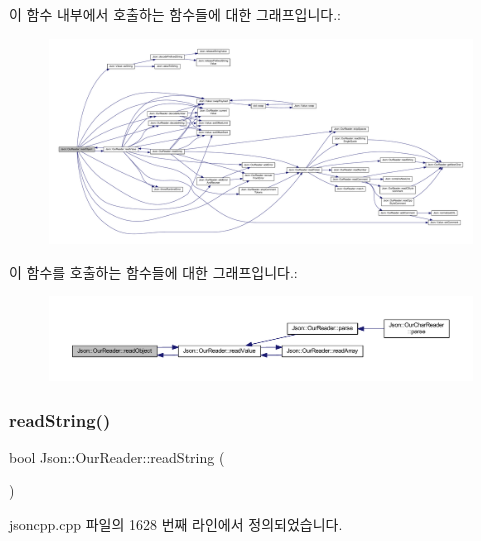 이 함수 내부에서 호출하는 함수들에 대한 그래프입니다.\+:\nopagebreak
\begin{figure}[H]
\begin{center}
\leavevmode
\includegraphics[width=350pt]{class_json_1_1_our_reader_aea198f8101dba55099f4d8121a993530_cgraph}
\end{center}
\end{figure}
이 함수를 호출하는 함수들에 대한 그래프입니다.\+:\nopagebreak
\begin{figure}[H]
\begin{center}
\leavevmode
\includegraphics[width=350pt]{class_json_1_1_our_reader_aea198f8101dba55099f4d8121a993530_icgraph}
\end{center}
\end{figure}
\mbox{\label{class_json_1_1_our_reader_a5d39b12671499ec5975f3bbc84b7d438}} 
\subsubsection{\texorpdfstring{read\+String()}{readString()}}
{\footnotesize\ttfamily bool Json\+::\+Our\+Reader\+::read\+String (\begin{DoxyParamCaption}{ }\end{DoxyParamCaption})\hspace{0.3cm}{\ttfamily [private]}}



jsoncpp.\+cpp 파일의 1628 번째 라인에서 정의되었습니다.


